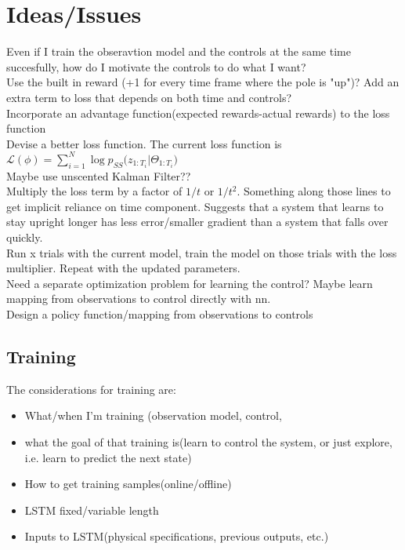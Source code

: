 \documentclass[twoside]{article}
\begin{document}
\section{Ideas/Issues}
Even if I train the obseravtion model and the controls at the same time succesfully, how do I motivate the controls to do what I want?\\

Use the built in reward (+1 for every time frame where the pole is "up")? Add an extra term to loss that depends on both time and controls?\\

Incorporate an advantage function(expected rewards-actual rewards) to the loss function\\

Devise a better loss function. The current loss function is $\mathcal{L}(\phi)=\sum_{i=1}^{N}{\log{p_{SS}}(z_{1:T_{i}}|\Theta_{1:T_{i}}})$\\

Maybe use unscented Kalman Filter??\\

Multiply the loss term by a factor of $1/t$ or $1/t^{2}$. Something along those lines to get implicit reliance on time component. Suggests that a system that learns to stay upright longer has less error/smaller gradient than a system that falls over quickly.\\

Run x trials with the current model, train the model on those trials with the loss multiplier. Repeat with the updated parameters.\\

Need a separate optimization problem for learning the control? Maybe learn mapping from observations to control directly with nn.\\
Design a policy function/mapping from observations to controls

\subsection{Training}
The considerations for training are:
\begin{itemize}
\item What/when I'm training (observation model, control, 
\item what the goal of that training is(learn to control the system, or just explore, i.e. learn to predict the next state)
\item How to get training samples(online/offline)
\item LSTM fixed/variable length
\item Inputs to LSTM(physical specifications, previous outputs, etc.)
\end{itemize}
\end{document}
